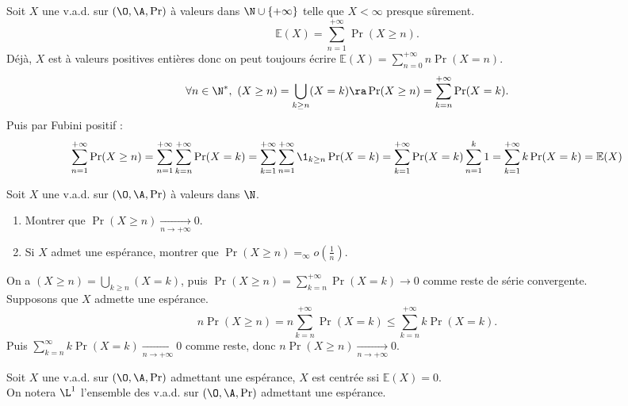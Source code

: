 \documentclass[11pt]{article}
\renewcommand*{\E}{\mathbb{E}}
\begin{document}
\begin{prop}{}{}
    Soit $X$ une v.a.d. sur $(\O,\A,\Pr)$ à valeurs dans $\N\cup\{+\infty\}$ telle que $X<\infty$ presque sûrement.
    \begin{equation*}
        \E(X) = \sum_{n=1}^{+\infty} \Pr(X\geq n).
    \end{equation*}
    \tcblower
    Déjà, $X$ est à valeurs positives entières donc on peut toujours écrire $\E(X)=\sum_{n=0}^{+\infty}n\Pr(X=n)$.
    \begin{equation*}
        \forall n \in \N^*, ~ (X \geq n) = \bigcup_{k\geq n}(X=k) \ra \Pr(X\geq n) = \sum_{k=n}^{+\infty}\Pr(X=k).
    \end{equation*}
    Puis par Fubini positif :
    \begin{equation*}
        \sum_{n=1}^{+\infty}\Pr(X\geq n)=\sum_{n=1}^{+\infty}\sum_{k=n}^{+\infty}\Pr(X=k) = \sum_{k=1}^{+\infty}\sum_{n=1}^{+\infty}\1_{k\geq n}\Pr(X=k) = \sum_{k=1}^{+\infty}\Pr(X=k)\sum_{n=1}^k1 = \sum_{k=1}^{+\infty}k\Pr(X = k) = \E(X)
    \end{equation*}
\end{prop}

\pagebreak

\begin{exercice}{}{}
    Soit $X$ une v.a.d. sur $(\O,\A,\Pr)$ à valeurs dans $\N$.
    \begin{enumerate}
        \item Montrer que $\Pr(X\geq n)\xrightarrow[n\to+\infty]{}0$.\\[-0.5cm]
        \item Si $X$ admet une espérance, montrer que $\Pr(X\geq n)=_{\infty}o\left( \frac{1}{n} \right)$.
    \end{enumerate}
    \tcblower
     On a $(X\geq n)=\bigcup_{k\geq n}(X = k)$, puis $\Pr(X\geq n)=\sum_{k=n}^{+\infty} \Pr(X=k) \to 0$ comme reste de série convergente.\\
     Supposons que $X$ admette une espérance. 
    \begin{equation*}
        n\Pr(X\geq n) = n\sum_{k=n}^{+\infty}\Pr(X=k)\leq \sum_{k=n}^{+\infty}k\Pr(X=k).
    \end{equation*}
    Puis $\sum_{k=n}^{\infty}k\Pr(X=k)\xrightarrow[n\to+\infty]{}0$ comme reste, donc $n\Pr(X\geq n)\xrightarrow[n\to+\infty]{}0$.
\end{exercice}

\vspace*{-0.8cm}

\begin{defi}{}{}
    Soit $X$ une v.a.d. sur $(\O,\A,\Pr)$ admettant une espérance, $X$ est centrée ssi $\E(X)=0$.\\
    On notera $\L^1$ l'ensemble des v.a.d. sur $(\O,\A,\Pr)$ admettant une espérance. 
\end{defi}
\end{document}
